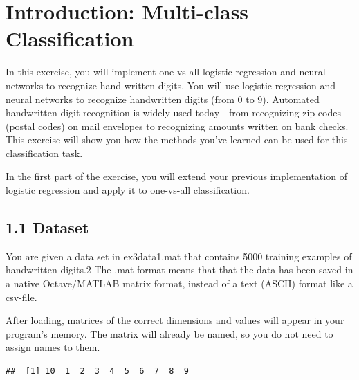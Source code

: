 \documentclass[
]{book}
\newenvironment{Shaded}{\begin{snugshade}}{\end{snugshade}}
\newcommand{\KeywordTok}[1]{\textcolor[rgb]{0.13,0.29,0.53}{\textbf{#1}}}
\newcommand{\NormalTok}[1]{#1}
\newcommand{\OperatorTok}[1]{\textcolor[rgb]{0.81,0.36,0.00}{\textbf{#1}}}
\newcommand{\StringTok}[1]{\textcolor[rgb]{0.31,0.60,0.02}{#1}}
\begin{document}
\hypertarget{introduction-multi-class-classification}{%
\section{Introduction: Multi-class Classification}\label{introduction-multi-class-classification}}

In this exercise, you will implement one-vs-all logistic regression and neural networks to recognize hand-written digits. You will use logistic regression and neural networks to recognize handwritten digits (from 0 to 9). Automated handwritten digit recognition is widely used today - from recognizing zip codes (postal codes) on mail envelopes to recognizing amounts written on bank checks. This exercise will show you how the methods you've learned can be used for this classification task.

In the first part of the exercise, you will extend your previous implementation of logistic regression and apply it to one-vs-all classification.

\hypertarget{dataset}{%
\subsection{1.1 Dataset}\label{dataset}}

You are given a data set in ex3data1.mat that contains 5000 training examples of handwritten digits.2 The .mat format means that that the data has been saved in a native Octave/MATLAB matrix format, instead of a text (ASCII) format like a csv-file.

After loading, matrices of the correct dimensions and values will appear in your program's memory. The matrix will already be named, so you do not need to assign names to them.

\begin{Shaded}
\end{Shaded}

\begin{verbatim}
##  [1] 10  1  2  3  4  5  6  7  8  9
\end{verbatim}
\end{document}

